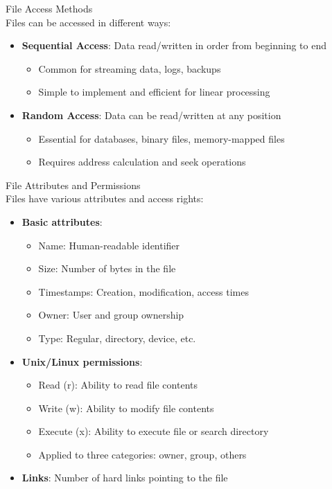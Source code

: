 \begin{definition}{File Access Methods}\\
    Files can be accessed in different ways:
    \begin{itemize}
        \item \textbf{Sequential Access}: Data read/written in order from beginning to end
            \begin{itemize}
                \item Common for streaming data, logs, backups
                \item Simple to implement and efficient for linear processing
            \end{itemize}
        \item \textbf{Random Access}: Data can be read/written at any position
            \begin{itemize}
                \item Essential for databases, binary files, memory-mapped files
                \item Requires address calculation and seek operations
            \end{itemize}
    \end{itemize}
\end{definition}

\begin{definition}{File Attributes and Permissions}\\
    Files have various attributes and access rights:
    \begin{itemize}
        \item \textbf{Basic attributes}:
            \begin{itemize}
                \item Name: Human-readable identifier
                \item Size: Number of bytes in the file
                \item Timestamps: Creation, modification, access times
                \item Owner: User and group ownership
                \item Type: Regular, directory, device, etc.
            \end{itemize}
        \item \textbf{Unix/Linux permissions}:
            \begin{itemize}
                \item Read (r): Ability to read file contents
                \item Write (w): Ability to modify file contents
                \item Execute (x): Ability to execute file or search directory
                \item Applied to three categories: owner, group, others
            \end{itemize}
        \item \textbf{Links}: Number of hard links pointing to the file
    \end{itemize}
\end{definition}

